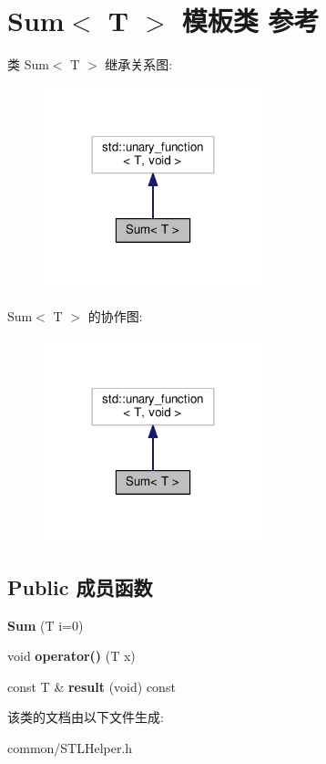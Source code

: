 \hypertarget{class_sum}{\section{Sum$<$ T $>$ 模板类 参考}
\label{class_sum}
}


类 Sum$<$ T $>$ 继承关系图\+:
\nopagebreak
\begin{figure}[H]
\begin{center}
\leavevmode
\includegraphics[width=180pt]{class_sum__inherit__graph}
\end{center}
\end{figure}


Sum$<$ T $>$ 的协作图\+:
\nopagebreak
\begin{figure}[H]
\begin{center}
\leavevmode
\includegraphics[width=180pt]{class_sum__coll__graph}
\end{center}
\end{figure}
\subsection*{Public 成员函数}
\begin{DoxyCompactItemize}
\item 
\hypertarget{class_sum_a6cd52faa9e035cc4c0ee78011ba87976}{{\bfseries Sum} (T i=0)}\label{class_sum_a6cd52faa9e035cc4c0ee78011ba87976}

\item 
\hypertarget{class_sum_a4974b7a1849fbb2a62a6aa0b9a5c6712}{void {\bfseries operator()} (T x)}\label{class_sum_a4974b7a1849fbb2a62a6aa0b9a5c6712}

\item 
\hypertarget{class_sum_a8fbf91934bbd458a2b49482820493935}{const T \& {\bfseries result} (void) const }\label{class_sum_a8fbf91934bbd458a2b49482820493935}

\end{DoxyCompactItemize}


该类的文档由以下文件生成\+:\begin{DoxyCompactItemize}
\item 
common/S\+T\+L\+Helper.\+h\end{DoxyCompactItemize}
